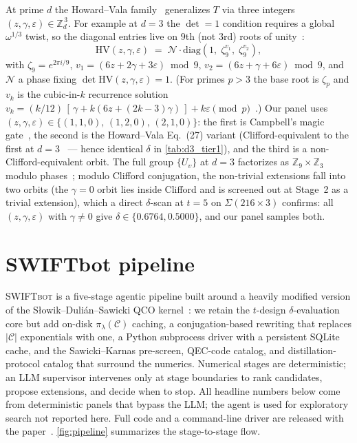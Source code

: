 \documentclass[twocolumn,superscriptaddress,showpacs,nofootinbib,notitlepage,preprintnumbers,secnumarabic,amssymb, nobibnotes, aps, prd]{revtex4-2}
\newcommand{\HV}[3]{\mathrm{HV}(#1,#2,#3)} %
\newcommand{\Sigmathree}[1]{\Sigma(#1\!\times\!3)} %
\newcommand{\SWIFTbot}{\textsc{SWIFTbot}\xspace}
\begin{document}
At prime $d$ the Howard--Vala family~\cite{Howard:2012fva} generalizes $T$ via three integers $(z,\gamma,\varepsilon) \in \mathbb{Z}_d^{\,3}$. For example at $d=3$ the $\det=1$ condition requires a global $\omega^{1/3}$ twist, so the diagonal entries live on $9$th (not $3$rd) roots of unity~\cite[Eq.~27]{Howard:2012fva}:
\begin{equation}
  \HV{z}{\gamma}{\varepsilon} \;=\; \mathcal{N}\cdot \mathrm{diag}\!\left(1,\; \zeta_9^{v_1},\; \zeta_9^{v_2}\right),
  \label{eq:HV_def}
\end{equation}
with $\zeta_9 = e^{2\pi i/9}$, $v_1 = (6z + 2\gamma + 3\varepsilon)\bmod 9$, $v_2 = (6z + \gamma + 6\varepsilon)\bmod 9$, and $\mathcal{N}$ a phase fixing $\det\HV{z}{\gamma}{\varepsilon}=1$. (For primes $p>3$ the base root is $\zeta_p$ and $v_k$ is the cubic-in-$k$ recurrence solution $v_k = (k/12)\,[\,\gamma + k(6z + (2k{-}3)\gamma)\,] + k\varepsilon \pmod{p}$~\cite[Eq.~24]{Howard:2012fva}.) Our panel uses $(z,\gamma,\varepsilon) \in \{(1,1,0),\,(1,2,0),\,(2,1,0)\}$: the first is Campbell's magic gate~\cite{Campbell:2012jna}, the second is the Howard--Vala Eq.~(27) variant (Clifford-equivalent to the first at $d=3$~\cite{Howard:2012fva} --- hence identical $\delta$ in \cref{tab:d3_tier1}), and the third is a non-Clifford-equivalent orbit. The full group $\{U_\upsilon\}$ at $d=3$ factorizes as $\mathbb{Z}_9\times\mathbb{Z}_3$ modulo phases~\cite[Eq.~35]{Howard:2012fva}; modulo Clifford conjugation, the non-trivial extensions fall into two orbits (the $\gamma=0$ orbit lies inside Clifford and is screened out at Stage~2 as a trivial extension), which a direct $\delta$-scan at $t=5$ on $\Sigmathree{216}$ confirms: all $(z,\gamma,\varepsilon)$ with $\gamma\neq 0$ give $\delta\in\{0.6764, 0.5000\}$, and our panel samples both.

\section{SWIFTbot pipeline}\label{sec:methods}

\SWIFTbot is a five-stage agentic pipeline built around a heavily modified version of the Słowik--Dulián--Sawicki QCO kernel~\cite{Slowik:2025qco}: we retain the $t$-design $\delta$-evaluation core but add on-disk $\pi_\lambda(\mathcal{C})$ caching, a conjugation-based rewriting that replaces $|\mathcal{C}|$ exponentials with one, a Python subprocess driver with a persistent SQLite cache, and the Sawicki--Karnas pre-screen, QEC-code catalog, and distillation-protocol catalog that surround the numerics. Numerical stages are deterministic; an LLM supervisor intervenes only at stage boundaries to rank candidates, propose extensions, and decide when to stop. All headline numbers below come from deterministic panels that bypass the LLM; the agent is used for exploratory search not reported here. Full code and a command-line driver are released with the paper~\cite{swiftbot_github}. \cref{fig:pipeline} summarizes the stage-to-stage flow.
\end{document}
